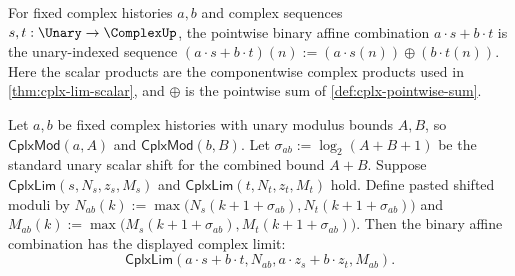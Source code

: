 \begin{definition}
\label{def:cplx-pointwise-binary-affine-combination}
For fixed complex histories $a,b$ and complex sequences $s,t:\Unary\to\ComplexUp$, the pointwise binary affine combination $a\cdot s+b\cdot t$ is the unary-indexed sequence $(a\cdot s+b\cdot t)(n):=(a\cdot s(n))\oplus(b\cdot t(n))$. Here the scalar products are the componentwise complex products used in \autoref{thm:cplx-lim-scalar}, and $\oplus$ is the pointwise sum of \autoref{def:cplx-pointwise-sum}.
\end{definition}

\begin{theorem}
\label{thm:cplx-lim-binary-affine-combination}
Let $a,b$ be fixed complex histories with unary modulus bounds $A,B$, so $\mathsf{CplxMod}(a,A)$ and $\mathsf{CplxMod}(b,B)$. Let $\sigma_{ab}:=\log_2(A+B+1)$ be the standard unary scalar shift for the combined bound $A+B$. Suppose $\mathsf{CplxLim}(s,N_s,z_s,M_s)$ and $\mathsf{CplxLim}(t,N_t,z_t,M_t)$ hold. Define pasted shifted moduli by $N_{ab}(k):=\max\bigl(N_s(k+1+\sigma_{ab}),N_t(k+1+\sigma_{ab})\bigr)$ and $M_{ab}(k):=\max\bigl(M_s(k+1+\sigma_{ab}),M_t(k+1+\sigma_{ab})\bigr)$. Then the binary affine combination has the displayed complex limit:
$$
\mathsf{CplxLim}(a\cdot s+b\cdot t,N_{ab},a\cdot z_s+b\cdot z_t,M_{ab}).
$$
\end{theorem}
